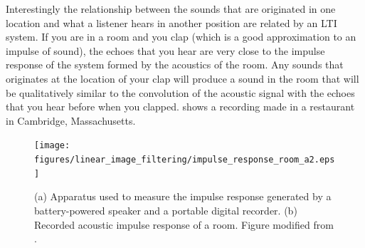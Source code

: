  
Interestingly the relationship between the sounds that are originated in one location and what a listener hears in another position are related by an LTI system. If you are in a room and you clap (which is a good approximation to an impulse of sound), the echoes that you hear are very close to the impulse response of the system formed by the acoustics of the room. Any sounds that originates at the location of your clap will produce a sound in the room that will be qualitatively similar to the convolution of the acoustic signal with the echoes that you hear before when you clapped. \Fig{\ref{fig:impulse_response_room_a2}} shows a recording made in a restaurant in Cambridge, Massachusetts.


\begin{figure}
\centerline{
\texttt{[image: figures/linear\_image\_filtering/impulse\_response\_room\_a2.eps]}
} 
\caption{(a) Apparatus used to measure the impulse response generated by a battery-powered speaker and a
portable digital recorder. (b) Recorded acoustic impulse response of a room. Figure modified from \cite{TraerE7856}.}
\label{fig:impulse_response_room_a2}
\end{figure}






